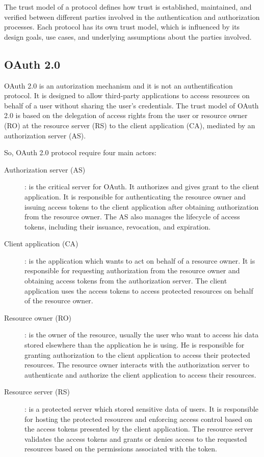 \documentclass[../memoire.tex]{subfiles}
\begin{document}
The trust model of a protocol defines how trust is established, maintained, and verified between different parties involved in the authentication and authorization processes. Each protocol has its own trust model, which is influenced by its design goals, use cases, and underlying assumptions about the parties involved.

\subsection{OAuth 2.0}

OAuth 2.0 is an autorization mechanism and it is not an authentification protocol. It is designed to allow third-party applications to access resources on behalf of a user without sharing the user's credentials. The trust model of OAuth 2.0 is based on the delegation of access rights from the user or resource owner (RO) at the resource server (RS) to the client application (CA), mediated by an authorization server (AS). 

So, OAuth 2.0 protocol require four main actors:
\begin{description}
  \item[Authorization server (AS)]:  is the critical server for OAuth. It authorizes and gives grant to the client application. It is responsible for authenticating the resource owner and issuing access tokens to the client application after obtaining authorization from the resource owner. The AS also manages the lifecycle of access tokens, including their issuance, revocation, and expiration. 
  \item[Client application (CA)]: is the application which wants to act on behalf of a resource owner. It is responsible for requesting authorization from the resource owner and obtaining access tokens from the authorization server. The client application uses the access tokens to access protected resources on behalf of the resource owner.
  \item[Resource owner (RO)]: is the owner of the resource, usually the user who want to access his data stored elsewhere than the application he is using. He is responsible for granting authorization to the client application to access their protected resources. The resource owner interacts with the authorization server to authenticate and authorize the client application to access their resources.
  \item[Resource server (RS)]: is a protected server which stored sensitive data of users. It is responsible for hosting the protected resources and enforcing access control based on the access tokens presented by the client application. The resource server validates the access tokens and grants or denies access to the requested resources based on the permissions associated with the token.
\end{description}
\end{document}
